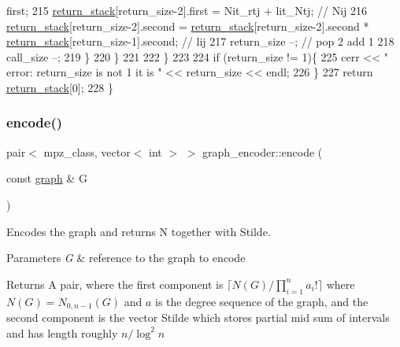 \begin{DoxyCode}
      first;
215         \hyperlink{namespacehelper__vars_a36577c81e805c58ec2ec7ed63882317f}{return\_stack}[return\_size-2].first = Nit\_rtj + lit\_Ntj; \textcolor{comment}{// Nij}
216         \hyperlink{namespacehelper__vars_a36577c81e805c58ec2ec7ed63882317f}{return\_stack}[return\_size-2].second = \hyperlink{namespacehelper__vars_a36577c81e805c58ec2ec7ed63882317f}{return\_stack}[return\_size-2].second * 
      \hyperlink{namespacehelper__vars_a36577c81e805c58ec2ec7ed63882317f}{return\_stack}[return\_size-1].second; \textcolor{comment}{// lij}
217         return\_size --; \textcolor{comment}{// pop 2 add 1}
218         call\_size --;
219       \}
220     \}
221 
222   \}
223 
224   \textcolor{keywordflow}{if} (return\_size != 1)\{
225     cerr << \textcolor{stringliteral}{" error: return\_size is not 1 it is "} << return\_size << endl;
226   \}
227   \textcolor{keywordflow}{return} \hyperlink{namespacehelper__vars_a36577c81e805c58ec2ec7ed63882317f}{return\_stack}[0];
228 \}
\end{DoxyCode}
\mbox{\label{classgraph__encoder_a23350e4c0986763b24d14c5ef1beb37e}} 
\subsubsection{\texorpdfstring{encode()}{encode()}}
{\footnotesize\ttfamily pair$<$ mpz\+\_\+class, vector$<$ int $>$ $>$ graph\+\_\+encoder\+::encode (\begin{DoxyParamCaption}\item[{const \hyperlink{classgraph}{graph} \&}]{G }\end{DoxyParamCaption})}



Encodes the graph and returns N together with Stilde. 


\begin{DoxyParams}{Parameters}
{\em G} & reference to the graph to encode \\
\hline
\end{DoxyParams}
\begin{DoxyReturn}{Returns}
A pair, where the first component is $\lceil N(G) / \prod_{i=1}^n a_i! \rceil$ where $N(G) = N_{0,n-1}(G)$ and $a$ is the degree sequence of the graph, and the second component is the vector Stilde which stores partial mid sum of intervals and has length roughly $n / \log^2 n$ 
\end{DoxyReturn}

